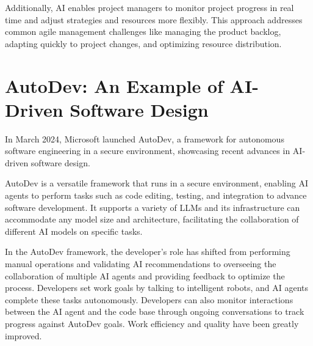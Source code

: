 \documentclass{article}
\begin{document}
Additionally, AI enables project managers to monitor project progress in real time and adjust strategies and resources more 
flexibly. This approach addresses common agile management challenges like managing the product backlog, adapting quickly to 
project changes, and optimizing resource distribution.\cite{8805739}

\section{AutoDev: An Example of AI-Driven Software Design}

In March 2024, Microsoft launched AutoDev, a framework for autonomous software engineering in a secure environment, showcasing 
recent advances in AI-driven software design.\cite{tufano2024autodev}

AutoDev is a versatile framework that runs in a secure environment, enabling AI agents to perform tasks such as code editing, 
testing, and integration to advance software development. It supports a variety of LLMs and its 
infrastructure can accommodate any model size and architecture, facilitating the collaboration of different AI models on 
specific tasks.

In the AutoDev framework, the developer's role has shifted from performing manual operations and validating AI recommendations 
to overseeing the collaboration of multiple AI agents and providing feedback to optimize the process. Developers set work goals 
by talking to intelligent robots, and AI agents complete these tasks autonomously. Developers can also monitor interactions 
between the AI agent and the code base through ongoing conversations to track progress against AutoDev goals. Work efficiency 
and quality have been greatly improved.

\end{document}
